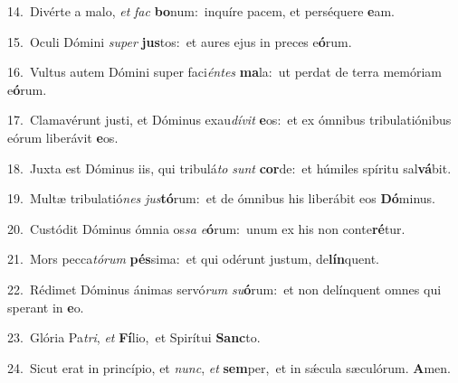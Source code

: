 {\numbfont\textcolor{\numbcolor}{14.}}~Divérte a malo, \textit{et} \textit{fac} \textbf{bo}\-num:~\star inquíre pacem, et perséquere \textbf{e}\-am.\par
{\numbfont\textcolor{\numbcolor}{15.}}~Oculi Dómini \textit{su}\-\textit{per} \textbf{jus}\-tos:~\star et aures ejus in preces e\-\textbf{ó}\-rum.\par
{\numbfont\textcolor{\numbcolor}{16.}}~Vultus autem Dómini super faci\-\textit{én}\-\textit{tes} \textbf{ma}\-la:~\star ut perdat de terra memóriam e\-\textbf{ó}\-rum.\par
{\numbfont\textcolor{\numbcolor}{17.}}~Clamavérunt justi, et Dóminus exau\-\textit{dí}\-\textit{vit} \textbf{e}\-os:~\star et ex ómnibus tribulatiónibus eórum liberávit \textbf{e}\-os.\par
{\numbfont\textcolor{\numbcolor}{18.}}~Juxta est Dóminus iis, qui tribulá\textit{to} \textit{sunt} \textbf{cor}\-de:~\star et húmiles spíritu sal\-\textbf{vá}\-bit.\par
{\numbfont\textcolor{\numbcolor}{19.}}~Multæ tribulatió\textit{nes} \textit{jus}\-\textbf{tó}rum:~\star et de ómnibus his liberábit eos \textbf{Dó}\-minus.\par
{\numbfont\textcolor{\numbcolor}{20.}}~Custódit Dóminus ómnia os\textit{sa} \textit{e}\-\textbf{ó}rum:~\star unum ex his non conte\-\textbf{ré}\-tur.\par
{\numbfont\textcolor{\numbcolor}{21.}}~Mors pecca\-\textit{tó}\-\textit{rum} \textbf{pés}\-sima:~\star et qui odérunt justum, de\-\textbf{lín}\-quent.\par
{\numbfont\textcolor{\numbcolor}{22.}}~Rédimet Dóminus ánimas servó\textit{rum} \textit{su}\-\textbf{ó}rum:~\star et non delínquent omnes qui sperant in \textbf{e}\-o.\par
{\numbfont\textcolor{\numbcolor}{23.}}~Glória Pa\-\textit{tri}\-, \textit{et} \textbf{Fí}\-lio,~\star et Spirítui \textbf{Sanc}\-to.\par
{\numbfont\textcolor{\numbcolor}{24.}}~Sicut erat in princípio, et \textit{nunc}\-, \textit{et} \textbf{sem}\-per,~\star et in sǽcula sæculórum. \textbf{A}\-men.\par
